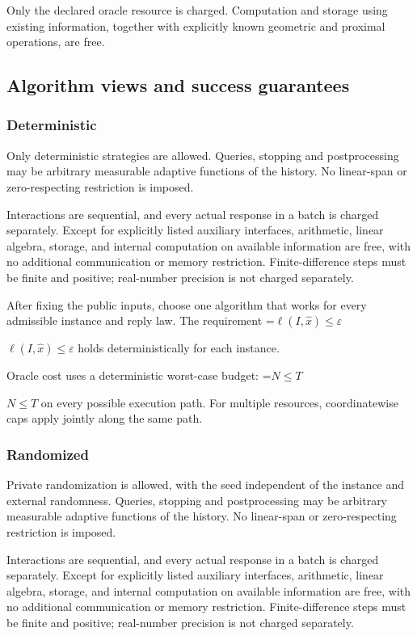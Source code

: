 \documentclass[10pt,a4paper]{article}
\newcommand{\AtlasMath}[1]{\par\begingroup\centering\setbox0=\hbox{$\displaystyle #1$}\ifdim\wd0>1.4\linewidth\typeout{ATLAS WIDE FORMULA: \the\wd0}\fi\ifdim\wd0>\linewidth\resizebox{\linewidth}{!}{\box0}\else\box0\fi\par\endgroup}
\newcommand{\AtlasInlineMath}[1]{\begingroup\setbox0=\hbox{$#1$}\ifdim\wd0>.4\linewidth\endgroup\AtlasMath{#1}\else\endgroup$#1$\fi}
\begin{document}
Only the declared oracle resource is charged. Computation and storage using existing information, together with explicitly known geometric and proximal operations, are free.

\subsection{Algorithm views and success guarantees}
\subsubsection{Deterministic}
Only deterministic strategies are allowed. Queries, stopping and postprocessing may be arbitrary measurable adaptive functions of the history. No linear-span or zero-respecting restriction is imposed.

Interactions are sequential, and every actual response in a batch is charged separately. Except for explicitly listed auxiliary interfaces, arithmetic, linear algebra, storage, and internal computation on available information are free, with no additional communication or memory restriction. Finite-difference steps must be finite and positive; real-number precision is not charged separately.

After fixing the public inputs, choose one algorithm that works for every admissible instance and reply law. The requirement \AtlasInlineMath{\ell(I,\widehat{x})\le \varepsilon} holds deterministically for each instance.

Oracle cost uses a deterministic worst-case budget: \AtlasInlineMath{N\le T} on every possible execution path. For multiple resources, coordinatewise caps apply jointly along the same path.

\subsubsection{Randomized}
Private randomization is allowed, with the seed independent of the instance and external randomness. Queries, stopping and postprocessing may be arbitrary measurable adaptive functions of the history. No linear-span or zero-respecting restriction is imposed.

Interactions are sequential, and every actual response in a batch is charged separately. Except for explicitly listed auxiliary interfaces, arithmetic, linear algebra, storage, and internal computation on available information are free, with no additional communication or memory restriction. Finite-difference steps must be finite and positive; real-number precision is not charged separately.
\end{document}
